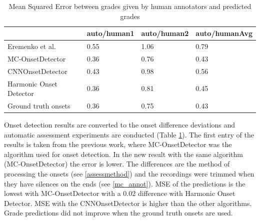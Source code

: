 \begin{table}
 \begin{center}
 \begin{tabular}{|l|l|l|l|}
  \hline
  & auto/human1 & auto/human2 & auto/humanAvg \\
  \hline
  Eremenko et al. \cite{eremenko2020performance} & 0.55 & 1.06 & 0.79\\
  MC-OnsetDetector & 0.36 & 0.76 & 0.43 \\
  CNNOnsetDetector & 0.43 & 0.98 & 0.56 \\
  Harmonic Onset Detector & 0.36 & 0.81 & 0.45 \\
  Ground truth onsets & 0.36 & 0.75 & 0.43 \\
  \hline
 \end{tabular}
\end{center}
 \caption{Mean Squared Error between grades given by human annotators and predicted grades}
 \label{tab:allassessment}
\end{table}

Onset detection results are converted to the onset difference deviations and automatic assessment experiments are conducted (Table \ref{tab:allassessment}). The first entry of the results is taken from the previous work, where MC-OnsetDetector was the algorithm used for onset detection. In the new result with the same algorithm (MC-OnsetDetector) the error is lower. The differences are the method of processing the onsets (see \ref{assessmethod}) and the recordings were trimmed when they have silences on the ends (see \ref{mc_annot}). MSE of the predictions is the lowest with MC-OnsetDetector with a 0.02 difference with Harmonic Onset Detector. MSE with the CNNOnsetDetector is higher than the other algorithms. Grade predictions did not improve when the ground truth onsets are used.  

\newpage
